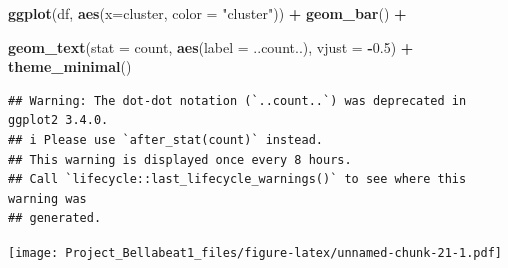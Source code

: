 \documentclass[
]{article}
\newenvironment{Shaded}{\begin{snugshade}}{\end{snugshade}}
\newcommand{\AttributeTok}[1]{\textcolor[rgb]{0.13,0.29,0.53}{#1}}
\newcommand{\CommentTok}[1]{\textcolor[rgb]{0.56,0.35,0.01}{\textit{#1}}}
\newcommand{\DecValTok}[1]{\textcolor[rgb]{0.00,0.00,0.81}{#1}}
\newcommand{\FloatTok}[1]{\textcolor[rgb]{0.00,0.00,0.81}{#1}}
\newcommand{\FunctionTok}[1]{\textcolor[rgb]{0.13,0.29,0.53}{\textbf{#1}}}
\newcommand{\NormalTok}[1]{#1}
\newcommand{\OtherTok}[1]{\textcolor[rgb]{0.56,0.35,0.01}{#1}}
\newcommand{\SpecialCharTok}[1]{\textcolor[rgb]{0.81,0.36,0.00}{\textbf{#1}}}
\newcommand{\StringTok}[1]{\textcolor[rgb]{0.31,0.60,0.02}{#1}}
\begin{document}
\begin{Shaded}
\begin{Highlighting}[]
\FunctionTok{ggplot}\NormalTok{(df, }\FunctionTok{aes}\NormalTok{(}\AttributeTok{x=}\NormalTok{cluster, }\AttributeTok{color =} \StringTok{"cluster"}\NormalTok{)) }\SpecialCharTok{+} \FunctionTok{geom\_bar}\NormalTok{() }\SpecialCharTok{+} 
  
  \FunctionTok{geom\_text}\NormalTok{(}\AttributeTok{stat =} \StringTok{\textquotesingle{}count\textquotesingle{}}\NormalTok{, }\FunctionTok{aes}\NormalTok{(}\AttributeTok{label =}\NormalTok{ ..count..), }\AttributeTok{vjust =} \SpecialCharTok{{-}}\FloatTok{0.5}\NormalTok{) }\SpecialCharTok{+}
  \FunctionTok{theme\_minimal}\NormalTok{()}
\end{Highlighting}
\end{Shaded}

\begin{verbatim}
## Warning: The dot-dot notation (`..count..`) was deprecated in ggplot2 3.4.0.
## i Please use `after_stat(count)` instead.
## This warning is displayed once every 8 hours.
## Call `lifecycle::last_lifecycle_warnings()` to see where this warning was
## generated.
\end{verbatim}

\texttt{[image: Project\_Bellabeat1\_files/figure-latex/unnamed-chunk-21-1.pdf]}

\begin{Shaded}
\end{Shaded}
\end{document}
